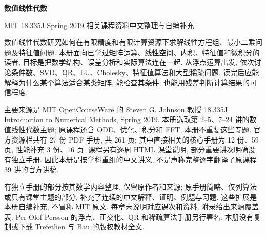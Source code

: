 \frontmatter
\begin{center}
{\color{structurecolor}\bfseries\fontsize{18}{25}\selectfont 数值线性代数\par}
\vspace{5pt}
{MIT 18.335J Spring 2019 相关课程资料中文整理与自编补充\par}
\end{center}
\originalpreface
数值线性代数研究如何在有限精度和有限计算资源下求解线性方程组、最小二乘问题及特征值问题. 本册面向已学过矩阵运算、线性空间、内积、特征值和微积分的读者, 目标是把数学结构、误差分析和实际算法连在一起. 从浮点运算出发, 依次讨论条件数、SVD、QR、LU、Cholesky、特征值算法和大型稀疏问题. 读完后应能解释为什么某个算法适合某类矩阵, 能检查其条件, 也能用残差判断计算结果的可信程度.

主要来源是 MIT OpenCourseWare 的 Steven G. Johnson 教授 18.335J Introduction to Numerical Methods, Spring 2019. 本册选取第 2--5、7--24 讲的数值线性代数主题; 原课程还含 ODE、优化、积分和 FFT, 本册不重复这些专题. 官方资源栏共有 27 份 PDF 手册, 共 261 页; 其中直接相关的核心手册为 12 份、59 页, 性能补充 3 份、16 页. 课程另有逐周 HTML 课堂说明, 部分重要讲次明确没有独立手册. 因此本册是按学科重组的中文讲义, 不是声称完整逐字翻译了原课程 39 讲的官方讲稿.

有独立手册的部分按其数学内容整理, 保留原作者和来源; 原手册简略、仅列算法或只有课堂主题的部分, 补充了连续的中文解释、证明、例题与习题. 这些扩展是本册自编补充, 不冒称 MIT 原文. 每章末说明对应课次和资料, 附录给出来源覆盖表. Per-Olof Persson 的浮点、正交化、QR 和稀疏算法手册另行署名. 本册没有复制或下载 Trefethen 与 Bau 的版权教材全文.

